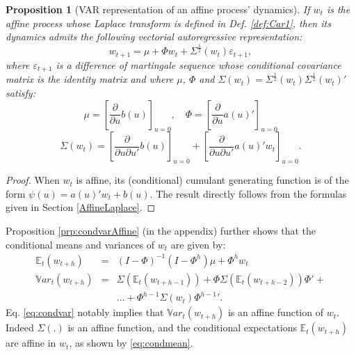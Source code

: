 \documentclass[
  12pt,
]{book}
\newtheorem{proposition}{Proposition}[chapter]
\theoremstyle{definition}
\theoremstyle{definition}
\theoremstyle{definition}
\theoremstyle{definition}
\theoremstyle{remark}
\begin{document}
\begin{proposition}[VAR representation of an affine process' dynamics]
\protect\hypertarget{prp:affineVAR}{}\label{prp:affineVAR}If \(w_t\) is the affine process whose Laplace transform is defined in Def. \ref{def:Car1}, then its dynamics admits the following vectorial autoregressive representation:
\begin{equation}
w_{t+1} = \mu + \Phi w_{t} + \Sigma^{\frac{1}{2}}(w_t) \varepsilon_{t+1},\label{eq:VARw}
\end{equation}
where \(\varepsilon_{t+1}\) is a difference of martingale sequence whose conditional covariance matrix is the identity matrix and where \(\mu\), \(\Phi\) and \(\Sigma(w_t) = \Sigma^{\frac{1}{2}}(w_t){\Sigma^{\frac{1}{2}}(w_t)}'\) satisfy:
\begin{equation}
\mu =  \left[\frac{\partial }{\partial u}b(u)\right]_{u=0}, \quad \Phi= \left[\frac{\partial }{\partial u}a(u)'\right]_{u=0}\label{eq:MUPHI}
\end{equation}
\begin{equation}
\Sigma(w_t) =  \left[\frac{\partial }{\partial u\partial u'}b(u)\right]_{u=0} + \left[\frac{\partial }{\partial u\partial u'}a(u)'w_t\right]_{u=0}.\label{eq:SigmaWt}
\end{equation}
\end{proposition}

\begin{proof}
When \(w_t\) is affine, its (conditional) cumulant generating function is of the form \(\psi(u)=a(u)'w_t+b(u)\). The result directly follows from the formulas given in Section \ref{AffineLaplace}.
\end{proof}

Proposition \ref{prp:condvarAffine} (in the appendix) further shows that the conditional means and variances of \(w_t\) are given by:
\begin{eqnarray}
\mathbb{E}_t(w_{t+h}) &=& (I - \Phi)^{-1}(I - \Phi^h)\mu + \Phi^h w_t \label{eq:condmean}\\
\mathbb{V}ar_t(w_{t+h}) &=& \Sigma(\mathbb{E}_t(w_{t+h-1}))+\Phi \Sigma(\mathbb{E}_t(w_{t+h-2}))\Phi' + \nonumber \\
&& \dots + \Phi^{h-1} \Sigma(w_{t}){\Phi^{h-1}}'. \label{eq:condvar}
\end{eqnarray}
Eq. \eqref{eq:condvar} notably implies that \(\mathbb{V}ar_t(w_{t+h})\) is an affine function of \(w_t\). Indeed \(\Sigma(.)\) is an affine function, and the conditional expectations \(\mathbb{E}_t(w_{t+h})\) are affine in \(w_t\), as shown by \eqref{eq:condmean}.
\end{document}
